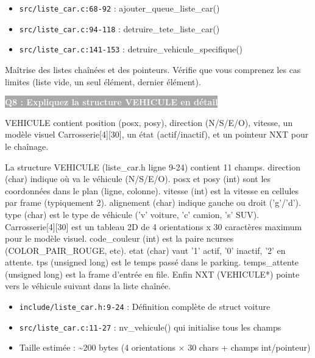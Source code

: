 \documentclass[12pt,a4paper]{article}
\newcommand{\question}[1]{%
    \vspace{0.5cm}
    \noindent\colorbox{darkgray}{\textcolor{white}{\textbf{#1}}}
    \vspace{0.3cm}
}
\begin{document}
\begin{reference_code}
\begin{itemize}
    \item \texttt{src/liste\_car.c:68-92} : ajouter\_queue\_liste\_car()
    \item \texttt{src/liste\_car.c:94-118} : detruire\_tete\_liste\_car()
    \item \texttt{src/liste\_car.c:141-153} : detruire\_vehicule\_specifique()
\end{itemize}
\end{reference_code}

\begin{objectif_prof}
Maîtrise des listes chaînées et des pointeurs. Vérifie que vous comprenez les cas limites (liste vide, un seul élément, dernier élément).
\end{objectif_prof}

\question{Q8 : Expliquez la structure VEHICULE en détail}

\begin{reponse_courte}
VEHICULE contient position (posx, posy), direction (N/S/E/O), vitesse, un modèle visuel Carrosserie[4][30], un état (actif/inactif), et un pointeur NXT pour le chaînage.
\end{reponse_courte}

\begin{reponse_longue}
La structure VEHICULE (liste\_car.h ligne 9-24) contient 11 champs. direction (char) indique où va le véhicule (N/S/E/O). posx et posy (int) sont les coordonnées dans le plan (ligne, colonne). vitesse (int) est la vitesse en cellules par frame (typiquement 2). alignement (char) indique gauche ou droit ('g'/'d'). type (char) est le type de véhicule ('v' voiture, 'c' camion, 's' SUV). Carrosserie[4][30] est un tableau 2D de 4 orientations x 30 caractères maximum pour le modèle visuel. code\_couleur (int) est la paire ncurses (COLOR\_PAIR\_ROUGE, etc). etat (char) vaut '1' actif, '0' inactif, '2' en attente. tps (unsigned long) est le temps passé dans le parking. temps\_attente (unsigned long) est la frame d'entrée en file. Enfin NXT (VEHICULE*) pointe vers le véhicule suivant dans la liste chaînée.
\end{reponse_longue}

\begin{reference_code}
\begin{itemize}
    \item \texttt{include/liste\_car.h:9-24} : Définition complète de struct voiture
    \item \texttt{src/liste\_car.c:11-27} : nv\_vehicule() qui initialise tous les champs
    \item Taille estimée : \textasciitilde{}200 bytes (4 orientations × 30 chars + champs int/pointeur)
\end{itemize}
\end{reference_code}
\end{document}
